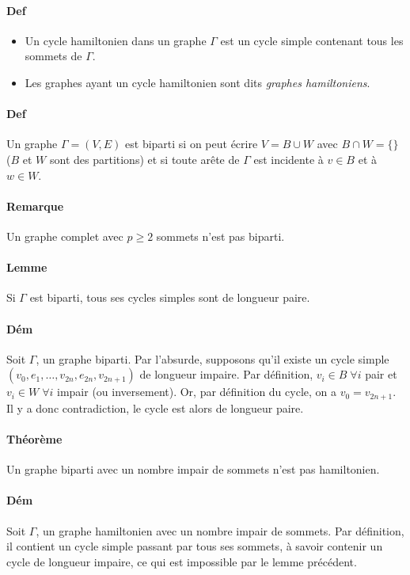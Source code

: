 \documentclass{article}
\newenvironment{lst}
	{\begin{minipage}[t]{.9\linewidth}\begin{itemize}}
	{\end{itemize}\end{minipage}}
\begin{document}
			\paragraph{Def}
				\begin{lst}
					\item Un cycle hamiltonien dans un graphe $\Gamma$ est un cycle simple contenant tous les sommets de $\Gamma$.
					\item Les graphes ayant un cycle hamiltonien sont dits \textit{graphes hamiltoniens}.
				\end{lst}

			\paragraph{Def} Un graphe $\Gamma = (V, E)$ est biparti si on peut écrire $V = B \cup W$ avec $B \cap W = \{\}$ ($B$ et $W$ sont des partitions)
			et si toute arête de $\Gamma$ est incidente à $v \in B$ et à $w \in W$.

			\paragraph{Remarque} Un graphe complet avec $p \geq 2$ sommets n'est pas biparti.

			\paragraph{Lemme} Si $\Gamma$ est biparti, tous ses cycles simples sont de longueur paire.

			\paragraph{Dém} Soit $\Gamma$, un graphe biparti. Par l'absurde, supposons qu'il existe un cycle simple $(v_0, e_1, \ldots, v_{2n}, e_{2n}, v_{2n+1})$
			de longueur impaire. Par définition, $v_i \in B \; \forall i$ pair et $v_i \in W \; \forall i$  impair (ou inversement). Or, par définition du cycle,
			on a $v_0 = v_{2n+1}$. Il y a donc contradiction, le cycle est alors de longueur paire.

			\paragraph{Théorème} Un graphe biparti avec un nombre impair de sommets n'est pas hamiltonien.

			\paragraph{Dém} Soit $\Gamma$, un graphe hamiltonien avec un nombre impair de sommets. Par définition, il contient un cycle simple passant
			par tous ses sommets, à savoir contenir un cycle de longueur impaire, ce qui est impossible par le lemme précédent.
\end{document}
